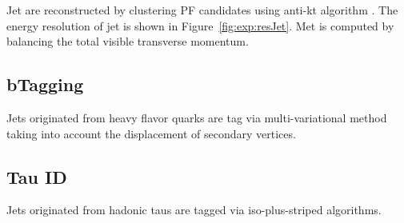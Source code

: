 Jet are reconstructed by clustering PF candidates using anti-kt algorithm \cite{tech:antikt:Cacciari:2008gp}. The energy resolution of jet is shown in Figure~\ref{fig:exp:resJet}. Met is computed by balancing the total visible transverse momentum. 



\subsection{bTagging}
Jets originated from heavy flavor quarks are tag via multi-variational method taking into account the displacement of secondary vertices.

\subsection{Tau ID}
 Jets originated from hadonic taus are tagged via iso-plus-striped algorithms.


